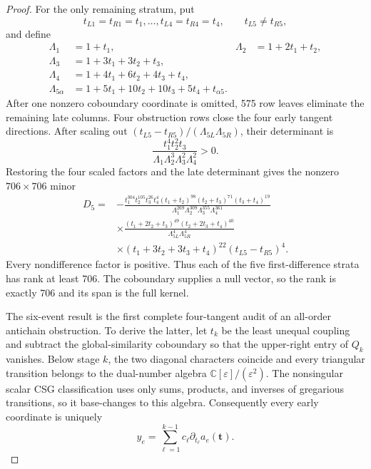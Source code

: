 \begin{proof}
For the only remaining stratum, put
\[
t_{L1}=t_{R1}=t_1,\ldots,t_{L4}=t_{R4}=t_4,
\qquad t_{L5}\ne t_{R5},
\]
and define
\begin{align*}
\Lambda_1&=1+t_1,&\Lambda_2&=1+2t_1+t_2,\\
\Lambda_3&=1+3t_1+3t_2+t_3,\\
\Lambda_4&=1+4t_1+6t_2+4t_3+t_4,\\
\Lambda_{5\alpha}&=1+5t_1+10t_2+10t_3+5t_4+t_{\alpha5}.
\end{align*}
After one nonzero coboundary coordinate is omitted, 575 row leaves
eliminate the remaining late columns.  Four obstruction rows close the
four early tangent directions.  After scaling out
\((t_{L5}-t_{R5})/(\Lambda_{5L}\Lambda_{5R})\), their determinant is
\[
\frac{t_1^4t_2^2t_3}
{\Lambda_1\Lambda_2^3\Lambda_3^2\Lambda_4^2}>0.
\]
Restoring the four scaled factors and the late determinant gives the
nonzero \(706\times706\) minor
\begin{equation}
\begin{split}
D_5={}&-\frac{t_1^{304}t_2^{105}t_3^{26}t_4^4
(t_1+t_2)^{98}(t_2+t_3)^{71}(t_3+t_4)^{19}}
{\Lambda_1^{269}\Lambda_2^{309}\Lambda_3^{355}\Lambda_4^{361}}\\
&\times
\frac{(t_1+2t_2+t_3)^{49}(t_2+2t_3+t_4)^{40}}
{\Lambda_{5L}^4\Lambda_{5R}^4}\\
&\times
(t_1+3t_2+3t_3+t_4)^{22}(t_{L5}-t_{R5})^4 .
\end{split}
\label{eq:bcgr-six-t5}
\end{equation}
Every nondifference factor is positive.  Thus each of the five
first-difference strata has rank at least 706.  The coboundary supplies a
null vector, so the rank is exactly 706 and its span is the full kernel.

The six-event result is the first complete four-tangent audit of an
all-order antichain obstruction.  To derive the latter, let \(t_k\) be the
least unequal coupling and subtract the global-similarity coboundary so that
the upper-right entry of \(Q_k\) vanishes.  Below stage \(k\), the two
diagonal characters coincide and every triangular transition belongs to
the dual-number algebra
\(\mathbb C[\varepsilon]/(\varepsilon^2)\).  The nonsingular scalar CSG
classification uses only sums, products, and inverses of gregarious
transitions, so it base-changes to this algebra.  Consequently every early
coordinate is uniquely
\[
y_e=\sum_{\ell=1}^{k-1}c_\ell\partial_{t_\ell}a_e(\bm t).
\]


\end{proof}
